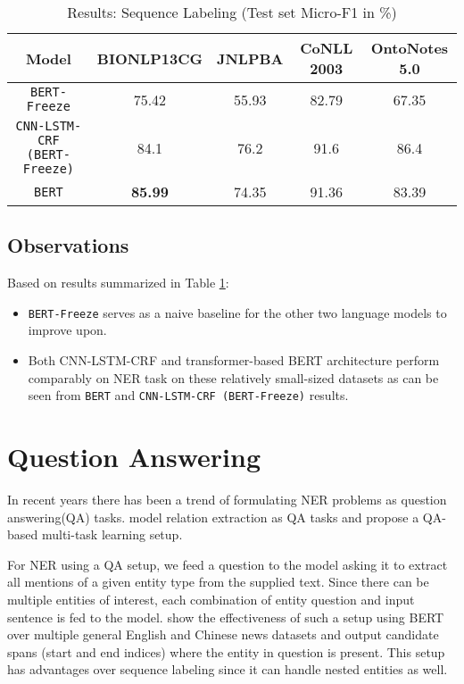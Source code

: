 \begin{table}[h!]
\centering
\begin{tabular}{|c|c|c|c|c|}\hline
	\textbf{Model} & \textbf{BIONLP13CG} & \textbf{JNLPBA} & \textbf{CoNLL 2003} & \textbf{OntoNotes 5.0}\\\hline
	\texttt{BERT-Freeze} & 75.42 & 55.93 & 82.79 & 67.35 \\\hline
	\texttt{CNN-LSTM-CRF (BERT-Freeze)} & 84.1 & 76.2 & 91.6 & 86.4 \\\hline
	\texttt{BERT} & \textbf{85.99} & 74.35 & 91.36 & 83.39 \\\hline
	\end{tabular}
    \caption{Results: Sequence Labeling (Test set Micro-F1 in \%)}
    \label{tab:res_seq_labeling}
\end{table}

\subsection{Observations}
Based on results summarized in Table \ref{tab:res_seq_labeling}:
\begin{itemize}
    \item \texttt{BERT-Freeze} serves as a naive baseline for the other two language models to improve upon.
    \item Both CNN-LSTM-CRF and transformer-based BERT architecture perform comparably on NER task on these relatively small-sized datasets as can be seen from \texttt{BERT} and \texttt{CNN-LSTM-CRF (BERT-Freeze)} results.
\end{itemize}

\section{Question Answering}
\label{sec:question_answering}
In recent years there has been a trend of formulating NER problems as question answering(QA) tasks. \cite{li2019entity, levy2017zero} model relation extraction as QA tasks and \cite{mccann2018natural} propose a QA-based multi-task learning setup. 

For NER using a QA setup, we feed a question to the model asking it to extract all mentions of a given entity type from the supplied text. Since there can be multiple entities of interest, each combination of entity question and input sentence is fed to the model. \cite{li2019unified, li2019dice} show the effectiveness of such a setup using BERT over multiple general English and Chinese news datasets and output candidate spans (start and end indices) where the entity in question is present. This setup has advantages over sequence labeling since it can handle nested entities as well. 

